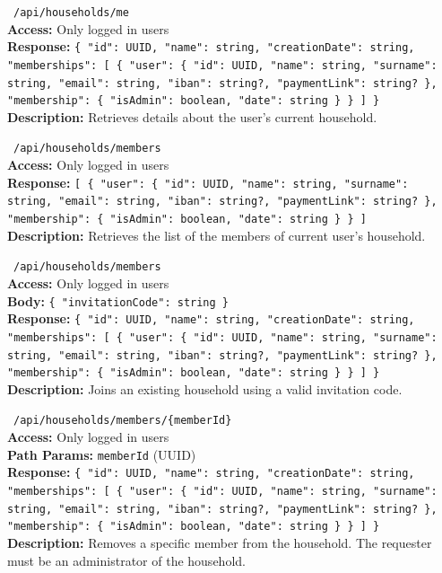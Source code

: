\vspace{0.3cm}
\noindent \apiGET\ \texttt{/api/households/me} \\
\textbf{Access:} Only logged in users \\
\textbf{Response:} \texttt{\{ "id": UUID, "name": string, "creationDate": string, "memberships": [ \{ "user": \{ "id": UUID, "name": string, "surname": string, "email": string, "iban": string?, "paymentLink": string? \}, "membership": \{ "isAdmin": boolean, "date": string \} \} ] \}} \\
\textbf{Description:} Retrieves details about the user's current household.

\vspace{0.3cm}
\noindent \apiGET\ \texttt{/api/households/members} \\
\textbf{Access:} Only logged in users \\
\textbf{Response:} \texttt{[ \{ "user": \{ "id": UUID, "name": string, "surname": string, "email": string, "iban": string?, "paymentLink": string? \}, "membership": \{ "isAdmin": boolean, "date": string \} \} ]} \\
\textbf{Description:} Retrieves the list of the members of current user's household.

\vspace{0.3cm}
\noindent \apiPOST\ \texttt{/api/households/members} \\
\textbf{Access:} Only logged in users \\
\textbf{Body:} \texttt{\{ "invitationCode": string \}} \\
\textbf{Response:} \texttt{\{ "id": UUID, "name": string, "creationDate": string, "memberships": [ \{ "user": \{ "id": UUID, "name": string, "surname": string, "email": string, "iban": string?, "paymentLink": string? \}, "membership": \{ "isAdmin": boolean, "date": string \} \} ] \}} \\
\textbf{Description:} Joins an existing household using a valid invitation code.

\vspace{0.3cm}
\noindent \apiDELETE\ \texttt{/api/households/members/\{memberId\}} \\
\textbf{Access:} Only logged in users \\
\textbf{Path Params:} \texttt{memberId} (UUID) \\
\textbf{Response:} \texttt{\{ "id": UUID, "name": string, "creationDate": string, "memberships": [ \{ "user": \{ "id": UUID, "name": string, "surname": string, "email": string, "iban": string?, "paymentLink": string? \}, "membership": \{ "isAdmin": boolean, "date": string \} \} ] \}} \\
\textbf{Description:} Removes a specific member from the household. The requester must be an administrator of the household.

